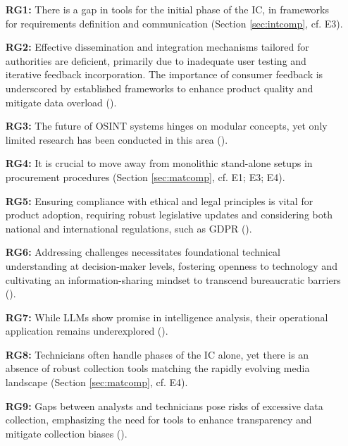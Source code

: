 \documentclass[10pt]{article}
\begin{document}
\begin{itemize}
    \item[\textbf{RG1:}] There is a gap in tools for the initial phase of the IC, in frameworks for requirements definition and communication (Section \ref{sec:intcomp}, cf. E3).

        \item[\textbf{RG2:}]Effective dissemination and integration mechanisms tailored for authorities are deficient, primarily due to inadequate user testing and iterative feedback incorporation. The importance of consumer feedback is underscored by established frameworks to enhance product quality and mitigate data overload (\cite{JointChiefsofStaffU.S.Army.2013, NorthAtlanticTreatyOrganization.2001}).

    \item[\textbf{RG3:}] The future of OSINT systems hinges on modular concepts, yet only limited research has been conducted in this area (\cite{Arjun.2020,Wright.2020}).

    \item[\textbf{RG4:}] It is crucial to move away from monolithic stand-alone setups in procurement procedures (Section \ref{sec:matcomp}, cf. E1; E3; E4).

    \item[\textbf{RG5:}] Ensuring compliance with ethical and legal principles is vital for product adoption, requiring robust legislative updates and considering both national and international regulations, such as GDPR (\cite{EuropeanParliament.2016, Wittmer.2022}).

    \item[\textbf{RG6:}] Addressing challenges necessitates foundational technical understanding at decision-maker levels, fostering openness to technology and cultivating an information-sharing mindset to transcend bureaucratic barriers (\cite{NorthAtlanticTreatyOrganization.2001}).

    \item[\textbf{RG7:}] While LLMs show promise in intelligence analysis, their operational application remains underexplored (\cite{Radford.2023}).

    \item[\textbf{RG8:}] Technicians often handle phases of the IC alone, yet there is an absence of robust collection tools matching the rapidly evolving media landscape (Section \ref{sec:matcomp}, cf. E4).

    \item[\textbf{RG9:}] Gaps between analysts and technicians pose risks of excessive data collection, emphasizing the need for tools to enhance transparency and mitigate collection biases (\cite{Lowenthal.2020}).
\end{itemize}
\end{document}
